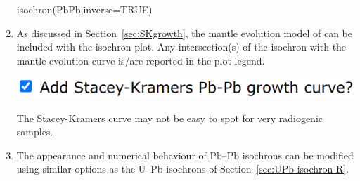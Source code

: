 \begin{refsection}
\begin{enumerate}
\begin{console}
isochron(PbPb,inverse=TRUE)
\end{console}

\item As discussed in Section~\ref{sec:SKgrowth}, the mantle evolution
  model of \citet{stacey1975} can be included with the isochron plot.
  Any intersection(s) of the isochron with the mantle evolution curve
  is/are reported in the plot legend.

\noindent\begin{minipage}[t]{.45\linewidth}
\strut\vspace*{-\baselineskip}\newline
\includegraphics[width=\linewidth]{../figures/PbPbIsochronSKcurve.png}
\end{minipage}
\begin{minipage}[t]{.55\linewidth}
  The Stacey-Kramers curve may not be easy to spot for very radiogenic
  samples.
\end{minipage}

\item The appearance and numerical behaviour of Pb--Pb isochrons can
  be modified using similar options as the U--Pb isochrons of
  Section~\ref{sec:UPb-isochron-R}.


\end{enumerate}
\end{refsection}
